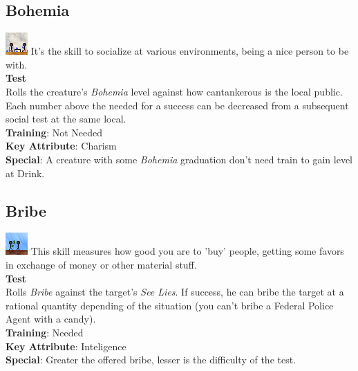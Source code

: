 \documentclass[ letterpaper,12pt]{article}
\begin{document}
\subsection{Bohemia}
\includegraphics{../data/skills/Img/boemia.png}
It's the skill to socialize at various environments, being a nice person to be with.\\
{\bf Test}\\
Rolls the creature's {\it Bohemia} level against how cantankerous is the local public. Each number above the needed for a success can be decreased from a subsequent social test at the same local.\\
{\bf Training}: Not Needed\\
{\bf Key Attribute}: Charism\\
{\bf Special}: A creature with some {\it Bohemia} graduation don't need train to gain level at Drink.

\subsection{Bribe}
\includegraphics{../data/skills/Img/suborno.png}
This skill measures how good you are to 'buy' people, getting some favors in exchange of money or other material stuff.\\
{\bf Test}\\
Rolls {\it Bribe} against the target's {\it See Lies}. If success, he can bribe the target at a rational quantity depending of the situation (you can't bribe a Federal Police Agent with a candy).\\
{\bf Training}: Needed\\
{\bf Key Attribute}: Inteligence\\
{\bf Special}: Greater the offered bribe, lesser is the difficulty of the test.
\end{document}
